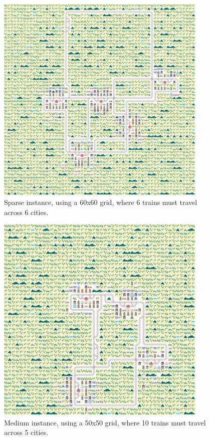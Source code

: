 \documentclass{llncs}
\begin{document}
\begin{figure}[h]
	
	\centering
	\includegraphics[width=0.9\textwidth]{sparse/sparse_0_1}
	\caption{Sparse instance, using a 60x60 grid, where 6 trains must travel across 6 cities.}
	\label{sparse_0_1_fullpage}
\end{figure}

\begin{figure}[h]
	
	\centering
	\includegraphics[width=0.9\textwidth]{medium/medium_0_1}
	\caption{Medium instance, using a 50x50 grid, where 10 trains must travel across 5 cities.}
	\label{medium_0_1_fullpage}
\end{figure}
\end{document}
